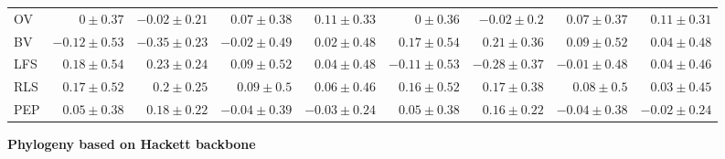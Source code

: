 \begin{landscape}
\begin{table}
\begin{footnotesize}
\begin{tabular}{@{}l|rrrr|rrrr@{}}
OV & $0 \pm 0.37$ & $-0.02 \pm 0.21$ & $0.07 \pm 0.38$ & $0.11 \pm 0.33$ & $0 \pm 0.36$ & $-0.02 \pm 0.2$ & $0.07 \pm 0.37$ & $0.11 \pm 0.31$\\
BV & $-0.12 \pm 0.53$ & $-0.35 \pm 0.23$ & $-0.02 \pm 0.49$ & $0.02 \pm 0.48$ & $0.17 \pm 0.54$ & $0.21 \pm 0.36$ & $0.09 \pm 0.52$ & $0.04 \pm 0.48$\\
LFS & $0.18 \pm 0.54$ & $0.23 \pm 0.24$ & $0.09 \pm 0.52$ & $0.04 \pm 0.48$ & $-0.11 \pm 0.53$ & $-0.28 \pm 0.37$ & $-0.01 \pm 0.48$ & $0.04 \pm 0.46$\\
RLS & $0.17 \pm 0.52$ & $0.2 \pm 0.25$ & $0.09 \pm 0.5$ & $0.06 \pm 0.46$ & $0.16 \pm 0.52$ & $0.17 \pm 0.38$ & $0.08 \pm 0.5$ & $0.03 \pm 0.45$\\
PEP & $0.05 \pm 0.38$ & $0.18 \pm 0.22$ & $-0.04 \pm 0.39$ & $-0.03 \pm 0.24$ & $0.05 \pm 0.38$ & $0.16 \pm 0.22$ & $-0.04 \pm 0.38$ & $-0.02 \pm 0.24$\\
\bottomrule
\end{tabular}

\textbf{Phylogeny based on Hackett backbone}


\end{footnotesize}
\end{table}
\end{landscape}
